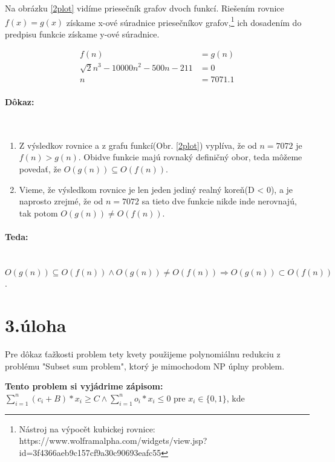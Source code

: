 \documentclass[11pt,a4paper]{article}
\begin{document}
Na obrázku \ref{2plot} vidíme priesečník grafov dvoch funkcí. Riešením rovnice $ f(x) = g(x) $ získame x-ové súradnice priesečníkov grafov,\footnote{Nástroj na výpocět kubickej rovnice: https://www.wolframalpha.com/widgets/view.jsp?id=3f4366aeb9c157cf9a30c90693eafc55} ich dosadením do predpisu funkcie získame y-ové súradnice.

\label{2equation}
\begin{align*}
    f(n) & = g(n) \\
   \sqrt{2} n^3 - 10000n^2 -500n -211 & = 0 \\
    n & = 7071.1
\end{align*}

\newpage
\paragraph{Dôkaz:}\mbox{{}}\\
\begin{enumerate}
    \item Z výsledkov rovnice a z grafu funkcí(Obr. \ref{2plot}) vyplíva, že od $n = 7072$ je $ f(n) > g(n)$. Obidve funkcie majú rovnaký definičný obor, teda môžeme povedať, že $ O(g(n)) \subseteq O(f(n)) $.

    \item Vieme, že výsledkom rovnice je len jeden jediný realný koreň(D < 0), a je naprosto zrejmé, že od $ n = 7072 $ sa tieto dve funkcie nikde inde nerovnajú, tak potom $ O(g(n)) \neq O(f(n)) $.
\end{enumerate}

\paragraph{Teda:}\mbox{{}}\\
$ O(g(n)) \subseteq O(f(n)) \land O(g(n)) \neq O(f(n)) \Rightarrow O(g(n)) \subset O(f(n)) $.


\newpage
\section{3.úloha}
Pre dôkaz ťažkosti problem tety kvety použijeme polynomiálnu redukciu z problému "Subset sum problem", ktorý je mimochodom NP úplny problem.

\textbf{Tento problem si vyjádrime zápisom: } \\

$\sum\limits_{i=1}^{n} (c_i + B) * x_i \geq C \land \sum\limits_{i=1}^{n} o_i * x_i \leq 0 $ pre $  x_i \in \{0, 1\} $, kde \\
\end{document}
